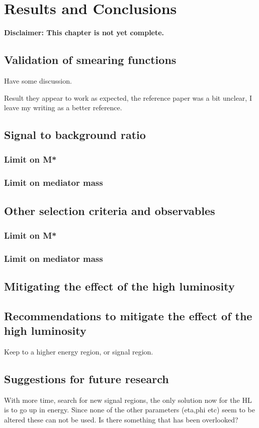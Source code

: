 \chapter{Results and Conclusions}\label{cha:res}
\textbf{Disclaimer: This chapter is not yet complete.}
\section{Validation of smearing functions}
Have some discussion.

Result they appear to work as expected, the reference paper was a bit unclear, I leave my writing as a better reference.

\section{Signal to background ratio}
\subsection{Limit on M*}
\subsection{Limit on mediator mass}

\section{Other selection criteria and observables}
\subsection{Limit on M*}
\subsection{Limit on mediator mass}
\section{Mitigating the effect of the high luminosity}

\section{Recommendations to mitigate the effect of the high luminosity}
Keep to a higher energy region, or signal region.
\section{Suggestions for future research}
With more time, search for new signal regions, the only solution now for the HL is to go up in energy. Since none of the other parameters (eta,phi etc) seem to be altered these can not be used. Is there something that has been overlooked?

